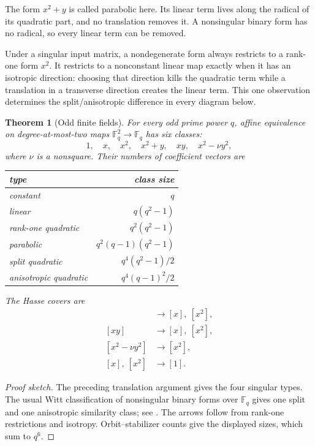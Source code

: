 \documentclass[11pt]{article}
\theoremstyle{definition}
\theoremstyle{plain}
\newtheorem{theorem}[definition]{Theorem}
\theoremstyle{remark}
\newcommand{\F}{\mathbb F}
\begin{document}
The form \(x^2+y\) is called parabolic here.  Its linear term lives along the
radical of its quadratic part, and no translation removes it.  A nonsingular
binary form has no radical, so every linear term can be removed.

Under a singular input matrix, a nondegenerate form always restricts to a
rank-one form \(x^2\).  It restricts to a nonconstant linear map exactly when
it has an isotropic direction: choosing that direction kills the quadratic
term while a translation in a transverse direction creates the linear term.
This one observation determines the split/anisotropic difference in every
diagram below.

\begin{theorem}[Odd finite fields]
For every odd prime power \(q\), affine equivalence on degree-at-most-two maps
\(\F_q^2\to\F_q\) has six classes:
\[
  1,\quad x,\quad x^2,\quad x^2+y,\quad xy,\quad x^2-\nu y^2,
\]
where \(\nu\) is a nonsquare.  Their numbers of coefficient vectors are
\begin{center}
\begin{tabular}{@{}lr@{}}
\toprule
type & class size\\
\midrule
constant & \(q\)\\
linear & \(q(q^2-1)\)\\
rank-one quadratic & \(q^2(q^2-1)\)\\
parabolic & \(q^2(q-1)(q^2-1)\)\\
split quadratic & \(q^4(q^2-1)/2\)\\
anisotropic quadratic & \(q^4(q-1)^2/2\)\\
\bottomrule
\end{tabular}
\end{center}
The Hasse covers are
\begin{align*}
  [x^2+y]&\longrightarrow[x],\ [x^2],\\
  [xy]&\longrightarrow[x],\ [x^2],\\
  [x^2-\nu y^2]&\longrightarrow[x^2],\\
  [x],\ [x^2]&\longrightarrow[1].
\end{align*}
\end{theorem}

\begin{proof}[Proof sketch]
The preceding translation argument gives the four singular types.  The usual
Witt classification of nonsingular binary forms over \(\F_q\) gives one split
and one anisotropic similarity class; see \cite{lam-quadratic,lidl-finite-fields}.
The arrows follow from rank-one restrictions and isotropy.  Orbit--stabilizer
counts give the displayed sizes, which sum to \(q^6\).
\end{proof}
\end{document}
